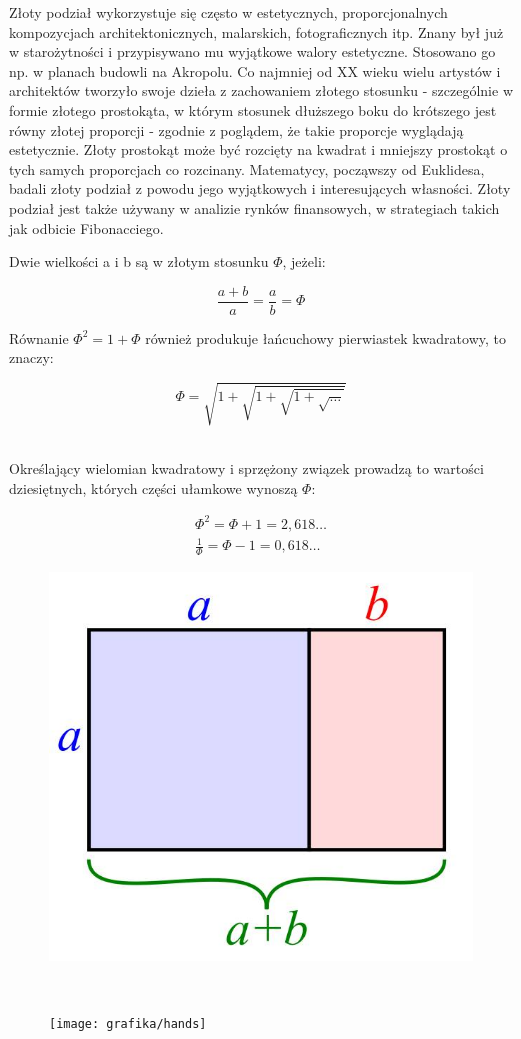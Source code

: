 \documentclass{article}
\begin{document}
Złoty podział wykorzystuje się często w estetycznych, proporcjonalnych kompozycjach architektonicznych, malarskich, fotograficznych itp. Znany był już w starożytności i przypisywano mu wyjątkowe walory estetyczne. Stosowano go np. w planach budowli na Akropolu. Co najmniej od XX wieku wielu artystów i architektów tworzyło swoje dzieła z zachowaniem złotego stosunku - szczególnie w formie złotego prostokąta, w którym stosunek dłuższego boku do krótszego jest równy złotej proporcji - zgodnie z poglądem, że takie proporcje wyglądają estetycznie. Złoty prostokąt może być rozcięty na kwadrat i mniejszy prostokąt o tych samych proporcjach co rozcinany. Matematycy, począwszy od Euklidesa, badali złoty podział z powodu jego wyjątkowych i interesujących własności. Złoty podział jest także używany w analizie rynków finansowych, w strategiach takich jak odbicie Fibonacciego.
\\
 \begin{center}Dwie wielkości a i b są w złotym stosunku $\Phi$, jeżeli:\end{center}
\begin{equation}
\frac{a+b}{a} = \frac{a}{b} = \Phi
\end{equation}
\begin{center} Równanie \begin{math} \Phi^{2} = 1 + \Phi \end{math} również produkuje łańcuchowy pierwiastek kwadratowy, to znaczy:\end{center}
\begin{equation}
\Phi = \sqrt{ 1+\sqrt{1+{\sqrt{1+{\sqrt{\ldots}}}}}}
\end{equation}
\\
\begin{center}Określający wielomian kwadratowy i sprzężony związek prowadzą to wartości dziesiętnych, których części ułamkowe wynoszą $\Phi$:\end{center}
\begin{eqnarray}
\Phi^{2} = \Phi + 1 = 2,618\ldots
\\
\frac{1}{\Phi} = \Phi - 1 = 0,618\ldots
\end{eqnarray}
\newpage
\begin{figure}
\includegraphics{grafika/prostokat}
\end{figure}
\\
\begin{figure}
\texttt{[image: grafika/hands]}
\end{figure}
\end{document}
